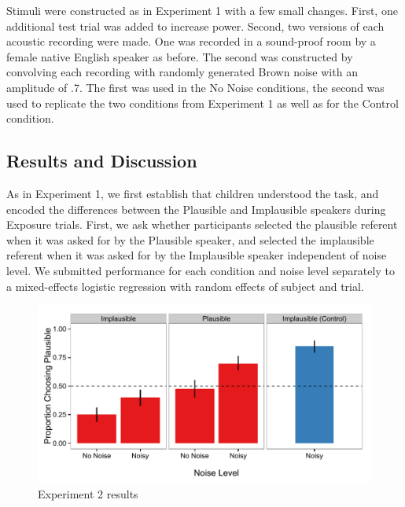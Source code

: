 \documentclass[man,floatsintext]{apa6}
\begin{document}
Stimuli were constructed as in Experiment 1 with a few small changes. First, one additional test trial was added to increase power. Second, two versions of each acoustic recording were made. One was recorded in a sound-proof room by a female native English speaker as before. The second was constructed by convolving each recording with randomly generated Brown noise with an amplitude of .7. The first was used in the No Noise conditions, the second was used to replicate the two conditions from Experiment 1 as well as for the Control condition.

\subsection{Results and Discussion}

As in Experiment 1, we first establish that children understood the task, and encoded the differences between the Plausible and Implausible speakers during Exposure trials. First, we ask whether participants selected the plausible referent when it was asked for by the Plausible speaker, and selected the implausible referent when it was asked for by the Implausible speaker independent of noise level. We submitted performance for each condition and noise level separately to a mixed-effects logistic regression with random effects of subject and trial. 

\begin{figure}[tb]
     \begin{center}
     \includegraphics[width=\textwidth]{figures/exp2_results.pdf}
    \end{center}
    \caption{Experiment 2 results}%
   \label{fig:exp2_results}
\end{figure}
\end{document}
